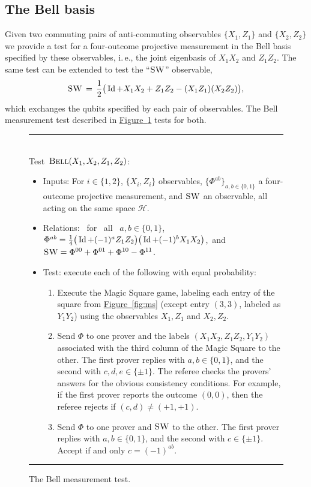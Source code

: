 \documentclass[11pt]{article}
\numberwithin{equation}{section}
\theoremstyle{definition}
\theoremstyle{plain}
\newcommand{\ie}{i.\,e.}
\newcommand{\expref}[2]{\hyperref[#2]{#1~\ref{#2}}}
\newcommand{\Id}{\ensuremath{\mathop{\rm Id}\nolimits}}
\newcommand{\mH}{\mathcal{H}}
\newcommand{\bellt}{\textsc{Bell}}
\newcommand{\SWAP}{\textsc{SW}}
\begin{document}
\subsection{The Bell basis}
\label{sec:bell}


Given two commuting pairs of anti-commuting observables $\{X_1,Z_1\}$ and $\{X_2,Z_2\}$ we provide a test for a four-outcome projective measurement in the Bell basis specified by these observables, \ie, the joint eigenbasis of $X_1X_2$ and $Z_1Z_2$. The same test can be extended to test the ``$\SWAP$'' observable,
\begin{equation}\label{eq:def-swap}
 \SWAP \,=\, \frac{1}{2} \big( \Id + X_1X_2 + Z_1Z_2 - (X_1Z_1)(X_2Z_2) \big),
\end{equation}
 which exchanges the  qubits specified by each pair of observables. The Bell measurement test described in \expref{Figure}{fig:bell} tests for both. 


\begin{figure}[H]
\rule[1ex]{\textwidth}{0.5pt}\\
\justifying
Test~$\bellt(X_1,X_2,Z_1,Z_2)$:
\begin{itemize}
\item Inputs: For $i\in\{1,2\}$, $\{X_i,Z_i\}$ observables, $\{\Phi^{ab}\}_{a,b\in\{0,1\}}$ a four-outcome projective measurement, and $\SWAP$ an observable, all acting on the same space $\mH$.
%
    \item Relations: \ for \ all \ $a,b\in\{0,1\}$, $\Phi^{ab} = \frac{1}{4}\big(\Id+(-1)^a Z_1Z_2\big)\big(\Id+(-1)^bX_1X_2\big)$,\ and 
      $\SWAP = \Phi^{00} + \Phi^{01} + \Phi^{10} - \Phi^{11}$.   
    \item Test: execute each of the following with equal probability:
		\begin{enumerate}
		\item[(a)] Execute the Magic Square game, labeling each entry of the square from \expref{Figure}{fig:ms} (except entry $(3,3)$, labeled as $Y_1Y_2$) using the observables $X_1,Z_1$ and $X_2,Z_2$.
		\item[(b)] Send $\Phi$ to one prover and the labels $(X_1X_2,Z_1Z_2,Y_1Y_2)$ associated with the third column of the Magic Square to the other.  The first prover replies with $a,b\in\{0,1\}$, and the second with $c,d,e\in \{\pm 1\}$. The referee checks the provers' answers for the obvious consistency conditions. For example, if the first prover reports the outcome $(0,0)$, then the referee rejects if $(c,d)\neq (+1,+1)$. 
		\item[(c)] Send $\Phi$ to one prover and $\SWAP$ to the other. The first prover replies with $a,b\in\{0,1\}$, and the second with $c\in \{\pm 1\}$. Accept if and only $c=(-1)^{ab}$. 
		\end{enumerate}
\end{itemize}
\rule[2ex]{\textwidth}{0.5pt}\vspace{-.5cm}
\caption{The Bell measurement test.}
\label{fig:bell}
\end{figure}
\end{document}
